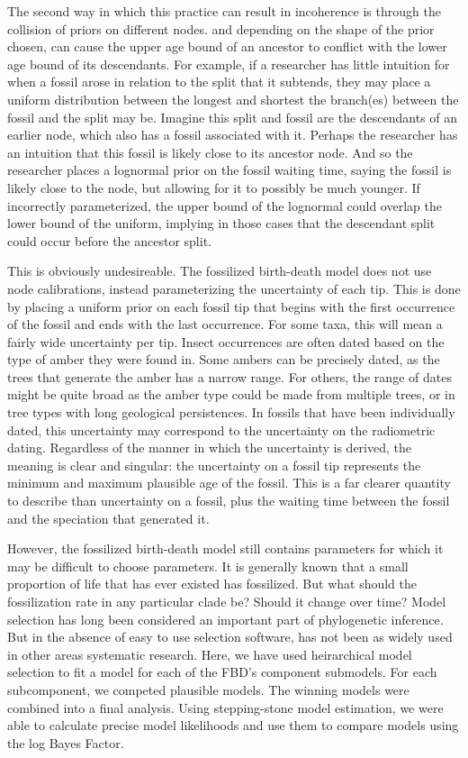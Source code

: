 \documentclass{article}
\begin{document}
The second way in which this practice can result in incoherence is through the collision of priors on different nodes.
and depending on the shape of the prior chosen, can cause the upper age bound of an ancestor to conflict with the lower age bound of its descendants. 
For example, if a researcher has little intuition for when a fossil arose in relation to the split that it subtends, they may place a uniform distribution between the longest and shortest the branch(es) between the fossil and the split may be.
Imagine this split and fossil are the descendants of an earlier node, which also has a fossil associated with it. 
Perhaps the researcher has an intuition that this fossil is likely close to its ancestor node. 
And so the researcher places a lognormal prior on the fossil waiting time, saying the fossil is likely close to the node, but allowing for it to possibly be much younger. 
If incorrectly parameterized, the upper bound of the lognormal could overlap the lower bound of the uniform, implying in those cases that the descendant split could occur before the ancestor split.

This is obviously undesireable.
The fossilized birth-death model does not use node calibrations, instead parameterizing the uncertainty of each tip.
This is done by placing a uniform prior on each fossil tip that begins with the first occurrence of the fossil and ends with the last occurrence. 
For some taxa, this will mean a fairly wide uncertainty per tip.
Insect occurrences are often dated based on the type of amber they were found in.
Some ambers can be precisely dated, as the trees that generate the amber has a narrow range.
For others, the range of dates might be quite broad as the amber type could be made from multiple trees, or in tree types with long geological persistences. 
In fossils that have been individually dated, this uncertainty may correspond to the uncertainty on the radiometric dating.
Regardless of the manner in which the uncertainty is derived, the meaning is clear and singular: the uncertainty on a fossil tip represents the minimum and maximum plausible age of the fossil.
This is a far clearer quantity to describe than uncertainty on a fossil, plus the waiting time between the fossil and the speciation that generated it. 

However, the fossilized birth-death model still contains parameters for which it may be difficult to choose parameters.
It is generally known that a small proportion of life that has ever existed has fossilized. 
But what should the fossilization rate in any particular clade be?
Should it change over time? 
Model selection has long been considered an important part of phylogenetic inference.
But in the absence of easy to use selection software, has not been as widely used in other areas systematic research.
Here, we have used heirarchical model selection to fit a model for each of the FBD's component submodels.
For each subcomponent, we competed plausible models.
The winning models were combined into a final analysis.
Using stepping-stone model estimation, we were able to calculate precise model likelihoods and use them to compare models using the log Bayes Factor.
\end{document}
